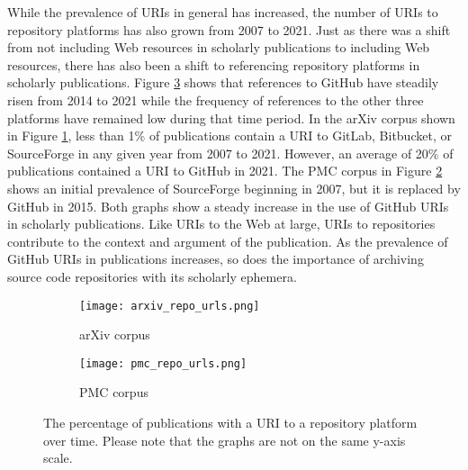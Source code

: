 While the prevalence of URIs in general has increased, the number of URIs to repository platforms has also grown from 2007 to 2021. Just as there was a shift from not including Web resources in scholarly publications to including Web resources, there has also been a shift to referencing repository platforms in scholarly publications. Figure \ref{fig:repo_urls} shows that references to GitHub have steadily risen from 2014 to 2021 while the frequency of references to the other three platforms have remained low during that time period. In the arXiv corpus shown in Figure \ref{fig:arxiv_repo_urls}, less than 1\% of publications contain a URI to GitLab, Bitbucket, or SourceForge in any given year from 2007 to 2021. However, an average of 20\% of publications contained a URI to GitHub in 2021. The PMC corpus in Figure \ref{fig:pmc_repo_urls} shows an initial prevalence of SourceForge beginning in 2007, but it is replaced by GitHub in 2015. Both graphs show a steady increase in the use of GitHub URIs in scholarly publications. Like URIs to the Web at large, URIs to repositories contribute to the context and argument of the publication. As the prevalence of GitHub URIs in publications increases, so does the importance of archiving source code repositories with its scholarly ephemera.

\begin{figure}[h]
\centering
\begin{subfigure}{\textwidth}
    \texttt{[image: arxiv\_repo\_urls.png]}
    \caption{arXiv corpus}
    \label{fig:arxiv_repo_urls}
\end{subfigure}
\hfill
\begin{subfigure}{\textwidth}
    \texttt{[image: pmc\_repo\_urls.png]}
    \caption{PMC corpus}
    \label{fig:pmc_repo_urls}
\end{subfigure}
        
\caption{The percentage of publications with a URI to a repository platform over time. Please note that the graphs are not on the same y-axis scale.}
\label{fig:repo_urls}
\end{figure}

